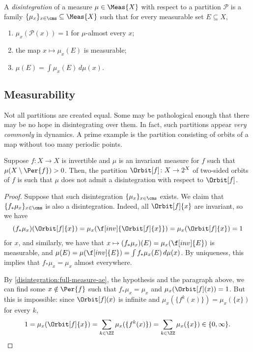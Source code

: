 \documentclass[../main]{subfiles}
\begin{document}
\begin{definition}[Disintegration]
  A \emph{disintegration} of a measure \(\mu \in \Meas{X}\) with respect to a partition \(\mathcal{P}\) is a family \(\{\mu_x\}_{x \in \cms} \subseteq \Meas{X}\) such that  for every measurable set \(E \subseteq X\), 
  \begin{enumerate}
  \item \(\mu_x(\mathcal{P}(x)) = 1\) for \(\mu\)-almost every \(x\);\label{disintegration:full-measure-ae}
  \item the map \(x \mapsto \mu_x(E)\) is measurable;
  \item \(\mu(E) = \int \mu_x(E) \,d\mu (x)\).
  \end{enumerate}
\end{definition}

\subsection{Measurability}

Not all partitions are created equal. Some may be pathological enough that there may be no hope in disintegrating over them. In fact, such partitions appear \emph{very commonly} in dynamics. A prime example is the partition consisting of orbits of a map without too many periodic points.

\begin{example}\label{eg:nonmeas-partition}
  Suppose \(f \colon X \to X\) is invertible and \(\mu\) is an invariant measure for \(f\) such that \(\mu(X \setminus \Per{f}) > 0\). Then, the partition \(\Orbit[f] \colon X \to 2^X\) of two-sided orbits of \(f\) is such that \(\mu\) does not admit a disintegration with respect to \(\Orbit[f]\).
\end{example}

\begin{proof}
  Suppose that such disintegration \(\{\mu_x\}_{x \in \cms}\) exists. We claim that \(\{f_*\mu_x\}_{x \in \cms}\) is also a disintegration.
  Indeed, all \(\Orbit[f]{x}\) are invariant, so we have
  \[(f_*\mu_x)(\Orbit[f]{x}) = \mu_x(\f[inv]{\Orbit[f]{x}}) = \mu_x(\Orbit[f]{x}) = 1\]
  for \almostevery \(x\), and similarly, we have that \(x \mapsto (f_*\mu_x)(E) = \mu_x(\f[inv]{E})\) is measurable, and \(\mu(E) = \mu(\f[inv]{E}) = \int f_*\mu_x(E) \,d\mu (x)\). By uniqueness, this implies that \(f_*\mu_x = \mu_x\) almost everywhere.

  By \cref{disintegration:full-measure-ae}, the hypothesis and the paragraph above, we can find some \(x \notin \Per{f}\) such that \(f_*\mu_x = \mu_x\) and \(\mu_x(\Orbit[f](x)) = 1\). But this is impossible: since \(\Orbit[f](x)\) is infinite and \(\mu_x(\{f^k(x)\}) = \mu_x(\{x\})\) for every \(k\),
  \begin{equation*}
    1 = \mu_x(\Orbit[f]{x}) = \sum_{k \in \ZZ} \mu_x(\{f^k(x)\}) = \sum_{k \in \ZZ} \mu_x(\{x\}) \in \{0, \infty\}.
  \end{equation*}
\end{proof}
\end{document}
